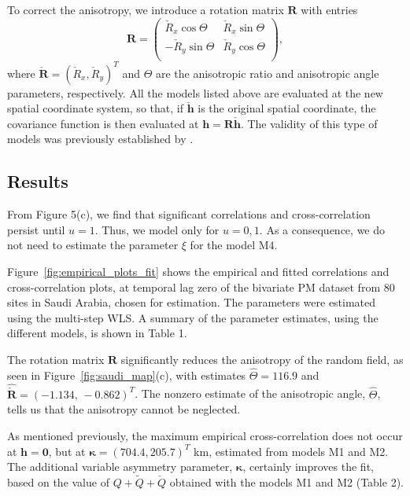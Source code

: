 \documentclass[12pt]{article}
\newcommand{\0}{\mathbf{0}}
\begin{document}
To correct the anisotropy, we introduce a rotation matrix $\mathbf{R}$ with entries 
\begin{equation}
\mathbf{R}=\begin{pmatrix}
\check{R}_x\cos\Theta & \check{R}_x\sin\Theta \\
-\check{R}_y\sin\Theta & \check{R}_y\cos\Theta\\
\end{pmatrix},
\end{equation}
where $\check{\mathbf{R}}=(\check{R}_x,\check{R}_y)^T$ and $\Theta$ are the anisotropic ratio and anisotropic angle parameters, respectively. All the models listed above are evaluated at the new spatial coordinate system, so that, if $\check{\mathbf{h}}$ is the original spatial coordinate, the covariance function is then evaluated at $\mathbf{h}=\mathbf{R}\check{\mathbf{h}}$. The validity of this type of models was previously established by \citet{hewer2017matern}.


\subsection{Results}

From Figure 5(c), we find that significant correlations and cross-correlation persist until $u=1$. Thus, we model only for $u=0,1$. As a consequence, we do not need to estimate the parameter $\xi$ for the model M4.

Figure~\ref{fig:empirical_plots_fit} shows the empirical and fitted correlations and cross-correlation plots, at temporal lag zero of the bivariate PM dataset from 80 sites in Saudi Arabia, chosen for estimation. The parameters were estimated using the multi-step WLS. A summary of the parameter estimates, using the different models, is shown in Table 1.

The rotation matrix $\mathbf{R}$ significantly reduces the anisotropy of the random field, as seen in Figure~\ref{fig:saudi_map}(c), with estimates $\hat{\Theta}=116.9$ and $\hat {\check{\mathbf{R}}}=(-1.134,\, -0.862)^T$.
The nonzero estimate of the anisotropic angle, $\hat{\Theta}$, tells us that the anisotropy cannot be neglected.

As mentioned previously, the maximum empirical cross-correlation does not occur at $\mathbf{h}=\mathbf{0}$, but at $\boldsymbol{\kappa}=(704.4,205.7)^T$ km, estimated from models M1 and M2. The additional variable asymmetry parameter, $\boldsymbol{\kappa}$, certainly improves the fit, based on the value of  $Q + \tilde{Q} + \check{Q} $ obtained with the models M1 and M2 (Table 2).
\end{document}
